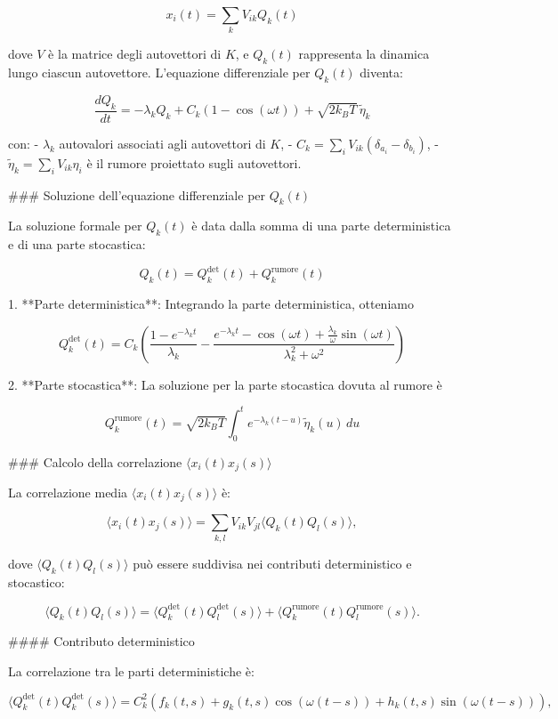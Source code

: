 \documentclass{article}
\begin{document}
\[
x_i(t) = \sum_k V_{ik} Q_k(t)
\]

dove \( V \) è la matrice degli autovettori di \( K \), e \( Q_k(t) \) rappresenta la dinamica lungo ciascun autovettore. L'equazione differenziale per \( Q_k(t) \) diventa:

\[
\frac{dQ_k}{dt} = -\lambda_k Q_k + C_k (1 - \cos(\omega t)) + \sqrt{2 k_B T} \, \tilde{\eta}_k
\]

con:
- \( \lambda_k \) autovalori associati agli autovettori di \( K \),
- \( C_k = \sum_i V_{ik} (\delta_{a_i} - \delta_{b_i}) \),
- \( \tilde{\eta}_k = \sum_i V_{ik} \eta_i \) è il rumore proiettato sugli autovettori.

### Soluzione dell'equazione differenziale per \( Q_k(t) \)

La soluzione formale per \( Q_k(t) \) è data dalla somma di una parte deterministica e di una parte stocastica:

\[
Q_k(t) = Q_k^{\text{det}}(t) + Q_k^{\text{rumore}}(t)
\]

1. **Parte deterministica**: Integrando la parte deterministica, otteniamo

   \[
   Q_k^{\text{det}}(t) = C_k \left( \frac{1 - e^{-\lambda_k t}}{\lambda_k} - \frac{e^{-\lambda_k t} - \cos(\omega t) + \frac{\lambda_k}{\omega} \sin(\omega t)}{\lambda_k^2 + \omega^2} \right)
   \]

2. **Parte stocastica**: La soluzione per la parte stocastica dovuta al rumore è

   \[
   Q_k^{\text{rumore}}(t) = \sqrt{2 k_B T} \int_0^t e^{-\lambda_k (t - u)} \tilde{\eta}_k(u) \, du
   \]

   ### Calcolo della correlazione \(\langle x_i(t) x_j(s) \rangle\)

   La correlazione media \(\langle x_i(t) x_j(s) \rangle\) è:
   
   \[
   \langle x_i(t) x_j(s) \rangle = \sum_{k, l} V_{ik} V_{jl} \langle Q_k(t) Q_l(s) \rangle,
   \]
   
   dove \(\langle Q_k(t) Q_l(s) \rangle\) può essere suddivisa nei contributi deterministico e stocastico:
   
   \[
   \langle Q_k(t) Q_l(s) \rangle = \langle Q_k^{\text{det}}(t) Q_l^{\text{det}}(s) \rangle + \langle Q_k^{\text{rumore}}(t) Q_l^{\text{rumore}}(s) \rangle.
   \]
   
   #### Contributo deterministico
   
   La correlazione tra le parti deterministiche è:
   
   \[
   \langle Q_k^{\text{det}}(t) Q_k^{\text{det}}(s) \rangle = C_k^2 \left( f_k(t, s) + g_k(t, s) \cos(\omega (t - s)) + h_k(t, s) \sin(\omega (t - s)) \right),
   \]
   
\end{document}
